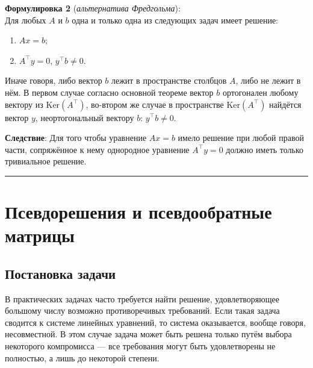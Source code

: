 \documentclass[11pt,a4paper]{article}
\providecommand{\tightlist}{%
      \setlength{\itemsep}{0pt}\setlength{\parskip}{0pt}}
\begin{document}
\textbf{Формулировка 2} (\emph{альтернатива Фредгольма}):\\
Для любых \(A\) и \(b\) одна и только одна из следующих задач имеет
решение:

\begin{enumerate}
\def\labelenumi{\arabic{enumi}.}
\tightlist
\item
  \(Ax = b\);
\item
  \(A^\top y = 0\), \(y^\top b \ne 0\).
\end{enumerate}

Иначе говоря, либо вектор \(b\) лежит в пространстве столбцов \(A\),
либо не лежит в нём. В первом случае согласно основной теореме вектор
\(b\) ортогонален любому вектору из \(\mathrm{Ker}(A^\top)\), во-втором
же случае в пространстве \(\mathrm{Ker}(A^\top)\) найдётся вектор \(y\),
неортогональный вектору \(b\): \(y^\top b \ne 0\).

\textbf{Следствие}: Для того чтобы уравнение \(Ax=b\) имело решение при
любой правой части, сопряжённое к нему однородное уравнение
\(A^\top y = 0\) должно иметь только тривиальное решение.

    \begin{center}\rule{0.5\linewidth}{0.5pt}\end{center}

    \hypertarget{ux43fux441ux435ux432ux434ux43eux440ux435ux448ux435ux43dux438ux44f-ux438-ux43fux441ux435ux432ux434ux43eux43eux431ux440ux430ux442ux43dux44bux435-ux43cux430ux442ux440ux438ux446ux44b}{%
\section{Псевдорешения и псевдообратные
матрицы}\label{ux43fux441ux435ux432ux434ux43eux440ux435ux448ux435ux43dux438ux44f-ux438-ux43fux441ux435ux432ux434ux43eux43eux431ux440ux430ux442ux43dux44bux435-ux43cux430ux442ux440ux438ux446ux44b}}

    \hypertarget{ux43fux43eux441ux442ux430ux43dux43eux432ux43aux430-ux437ux430ux434ux430ux447ux438}{%
\subsection{Постановка
задачи}\label{ux43fux43eux441ux442ux430ux43dux43eux432ux43aux430-ux437ux430ux434ux430ux447ux438}}

В практических задачах часто требуется найти решение, удовлетворяющее
большому числу возможно противоречивых требований. Если такая задача
сводится к системе линейных уравнений, то система оказывается, вообще
говоря, несовместной. В этом случае задача может быть решена только
путём выбора некоторого компромисса --- все требования могут быть
удовлетворены не полностью, а лишь до некоторой степени.
\end{document}
